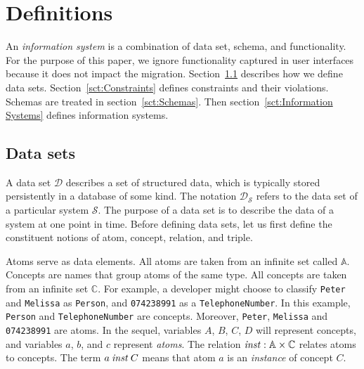 \documentclass[runningheads]{llncs}
\newcommand{\id}[1]{\text{\it #1\/}}
\newcommand{\instance}{\mathbin{\id{inst}}}
\newcommand{\Pair}[2]{#1\times#2}
\newcommand{\atom}[1]{{\tt\small #1}}
\newcommand{\Atoms}{\mathbb{A}}
\newcommand{\concept}[1]{{\tt\small #1}}
\newcommand{\Concepts}{\mathbb{C}}
\newcommand{\dataset}{\mathscr{D}}
\newcommand{\infsys}{\mathscr{S}}
\def\define#1{\label{dfn:#1}{\em #1}\index{#1}}
\begin{document}
\section{Definitions}
\label{sct:Definitions}
   An \define{information system} is a combination of data set, schema, and functionality.
   For the purpose of this paper, we ignore functionality captured in user interfaces because it does not impact the migration.
   Section~\ref{sct:Data sets} describes how we define data sets.
   Section~\ref{sct:Constraints} defines constraints and their violations.
   Schemas are treated in section~\ref{sct:Schemas}.
   Then section~\ref{sct:Information Systems} defines information systems.

\subsection{Data sets}
\label{sct:Data sets}
   A data set $\dataset$ describes a set of structured data, which is typically stored persistently in a database of some kind.
   The notation $\dataset_{\infsys}$ refers to the data set of a particular system $\infsys$.
   The purpose of a data set is to describe the data of a system at one point in time. 
   Before defining data sets, let us first define the constituent notions of atom, concept, relation, and triple.
   
   Atoms serve as data elements.
   All atoms are taken from an infinite set called $\Atoms$.
   Concepts are names that group atoms of the same type.
   All concepts are taken from an infinite set $\Concepts$.
   For example, a developer might choose to classify \atom{Peter} and \atom{Melissa} as \concept{Person},
   and \atom{074238991} as a \concept{TelephoneNumber}.
   In this example, \concept{Person} and \concept{TelephoneNumber} are concepts.
   Moreover, \atom{Peter}, \atom{Melissa} and \atom{074238991} are atoms.
   In the sequel, variables $A$, $B$, $C$, $D$ will represent concepts, and variables $a$, $b$, and $c$ represent \emph{atoms}.
   The relation $\instance:\Pair{\Atoms}{\Concepts}$ relates atoms to concepts.
   The term $a\instance C$ means that atom $a$ is an \emph{instance} of concept $C$.
\end{document}
